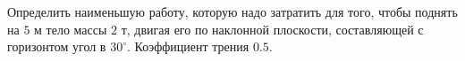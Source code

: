 Определить наименьшую работу, которую надо затратить для того, чтобы
поднять на $5$ м тело массы $2$ т, двигая его по наклонной плоскости,
составляющей с горизонтом угол в $30^\circ$. Коэффициент трения $0.5$.
